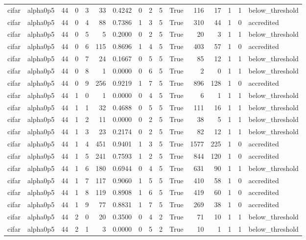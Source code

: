 \begin{tabular}{llrrrrrrrrrrrrrl}
cifar & alpha0p5 & 44 & 0 & 3 & 33 & 0.4242 & 0 & 2 & 5 & True & 116 & 17 & 1 & 1 & below\_threshold \\
cifar & alpha0p5 & 44 & 0 & 4 & 88 & 0.7386 & 1 & 3 & 5 & True & 310 & 44 & 1 & 0 & accredited \\
cifar & alpha0p5 & 44 & 0 & 5 & 5 & 0.2000 & 0 & 2 & 5 & True & 20 & 3 & 1 & 1 & below\_threshold \\
cifar & alpha0p5 & 44 & 0 & 6 & 115 & 0.8696 & 1 & 4 & 5 & True & 403 & 57 & 1 & 0 & accredited \\
cifar & alpha0p5 & 44 & 0 & 7 & 24 & 0.1667 & 0 & 5 & 5 & True & 85 & 12 & 1 & 1 & below\_threshold \\
cifar & alpha0p5 & 44 & 0 & 8 & 1 & 0.0000 & 0 & 6 & 5 & True & 2 & 0 & 1 & 1 & below\_threshold \\
cifar & alpha0p5 & 44 & 0 & 9 & 256 & 0.9219 & 1 & 7 & 5 & True & 896 & 128 & 1 & 0 & accredited \\
cifar & alpha0p5 & 44 & 1 & 0 & 1 & 0.0000 & 0 & 4 & 5 & True & 6 & 1 & 1 & 1 & below\_threshold \\
cifar & alpha0p5 & 44 & 1 & 1 & 32 & 0.4688 & 0 & 5 & 5 & True & 111 & 16 & 1 & 1 & below\_threshold \\
cifar & alpha0p5 & 44 & 1 & 2 & 11 & 0.0000 & 0 & 2 & 5 & True & 38 & 5 & 1 & 1 & below\_threshold \\
cifar & alpha0p5 & 44 & 1 & 3 & 23 & 0.2174 & 0 & 2 & 5 & True & 82 & 12 & 1 & 1 & below\_threshold \\
cifar & alpha0p5 & 44 & 1 & 4 & 451 & 0.9401 & 1 & 3 & 5 & True & 1577 & 225 & 1 & 0 & accredited \\
cifar & alpha0p5 & 44 & 1 & 5 & 241 & 0.7593 & 1 & 2 & 5 & True & 844 & 120 & 1 & 0 & accredited \\
cifar & alpha0p5 & 44 & 1 & 6 & 180 & 0.6944 & 0 & 4 & 5 & True & 631 & 90 & 1 & 1 & below\_threshold \\
cifar & alpha0p5 & 44 & 1 & 7 & 117 & 0.9060 & 1 & 5 & 5 & True & 410 & 58 & 1 & 0 & accredited \\
cifar & alpha0p5 & 44 & 1 & 8 & 119 & 0.8908 & 1 & 6 & 5 & True & 419 & 60 & 1 & 0 & accredited \\
cifar & alpha0p5 & 44 & 1 & 9 & 77 & 0.8831 & 1 & 7 & 5 & True & 269 & 38 & 1 & 0 & accredited \\
cifar & alpha0p5 & 44 & 2 & 0 & 20 & 0.3500 & 0 & 4 & 2 & True & 71 & 10 & 1 & 1 & below\_threshold \\
cifar & alpha0p5 & 44 & 2 & 1 & 3 & 0.0000 & 0 & 5 & 2 & True & 10 & 1 & 1 & 1 & below\_threshold \\

\end{tabular}
